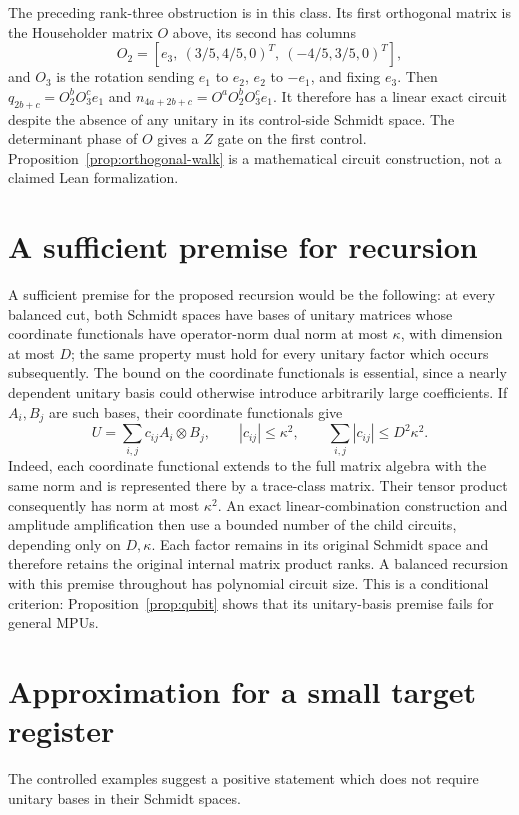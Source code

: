 \documentclass[11pt]{article}
\begin{document}
The preceding rank-three obstruction is in this class. Its first
orthogonal matrix is the Householder matrix $O$ above, its second
has columns
\[
 O_2=[e_3,\ (3/5,4/5,0)^T,\ (-4/5,3/5,0)^T],
\]
and $O_3$ is the rotation sending $e_1$ to $e_2$, $e_2$ to $-e_1$,
and fixing $e_3$. Then
$q_{2b+c}=O_2^bO_3^ce_1$ and
$n_{4a+2b+c}=O^aO_2^bO_3^ce_1$.
It therefore has a linear exact circuit despite the absence of any
unitary in its control-side Schmidt space. The determinant phase of
$O$ gives a $Z$ gate on the first control.
Proposition~\ref{prop:orthogonal-walk} is a mathematical circuit
construction, not a claimed Lean formalization.

\section{A sufficient premise for recursion}

A sufficient premise for the proposed recursion would be the following:
at every balanced cut, both Schmidt spaces have bases of unitary matrices
whose coordinate functionals have operator-norm dual norm at most
$\kappa$, with dimension at most $D$; the same property must hold for
every unitary factor which occurs subsequently. The bound on the
coordinate functionals is essential, since a nearly dependent unitary
basis could otherwise introduce arbitrarily large coefficients.
If $A_i,B_j$ are such bases, their coordinate functionals give
\[
 U=\sum_{i,j}c_{ij}A_i\otimes B_j,
 \qquad |c_{ij}|\leq\kappa^2,
 \qquad \sum_{i,j}|c_{ij}|\leq D^2\kappa^2.
\]
Indeed, each coordinate functional extends to the full matrix algebra
with the same norm and is represented there by a trace-class matrix.
Their tensor product consequently has norm at most $\kappa^2$.
An exact linear-combination construction and amplitude amplification
then use a bounded number of the child circuits, depending only on
$D,\kappa$. Each factor remains in its original Schmidt space and
therefore retains the original internal matrix product ranks.
A balanced recursion with this premise throughout has polynomial
circuit size. This is a conditional criterion: Proposition~\ref{prop:qubit}
shows that its unitary-basis premise fails for general MPUs.

\section{Approximation for a small target register}

The controlled examples suggest a positive statement which does not
require unitary bases in their Schmidt spaces.
\end{document}
